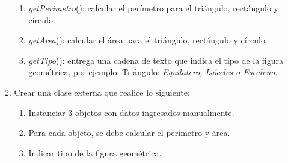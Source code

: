 \documentclass{article}
\begin{document}
\begin{enumerate}
\begin{enumerate}
			\begin{enumerate}
				\item \emph{getPerimetro}(): calcular el per\'imetro para el tri\'angulo, rect\'angulo y c\'irculo.
				\item \emph{getArea}(): calcular el \'area para el tri\'angulo, rect\'angulo y c\'irculo.
				\item \emph{getTipo}(): entrega una cadena de texto que indica el tipo de la figura geom\'etrica, por ejemplo: Tri\'angulo: \emph{Equilatero, Is\'oceles o Escaleno}.
			\end{enumerate}
			\item[] Crear una clase externa que realice lo siguiente:
			\begin{enumerate}
				\item Instanciar 3 objetos con datos ingresados manualmente.
				\item Para cada objeto, se debe calcular el per\'imetro y \'area.
				\item Indicar tipo de la figura geom\'etrica.
			\end{enumerate}
		\end{enumerate}

\end{enumerate}
\end{document}
